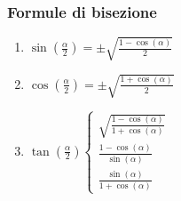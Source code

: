             \subsubsection{Formule di bisezione}\label{Trigonometria_Bisezione}
                \begin{enumerate}
                    \item {
                        $\sin(\frac{\alpha}{2}) =\pm\sqrt{\frac{1-\cos(\alpha)}{2}}$ 
                    }
                    \item {
                        $\cos(\frac{\alpha}{2}) =\pm\sqrt{\frac{1+\cos(\alpha)}{2}}$ 
                    }
                    \item {
                        $
                            \tan(\frac{\alpha}{2})
                            \begin{cases}
                                \sqrt{\frac{1-\cos(\alpha)}{1+\cos(\alpha)}} \\
                                \frac{1-\cos(\alpha)}{\sin(\alpha)}\\
                                \frac{\sin(\alpha)}{1+\cos(\alpha)}
                            \end{cases}
                        $
                    }
                \end{enumerate}
